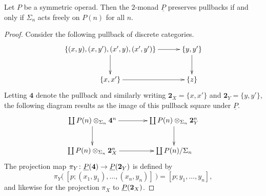 \begin{prop}\label{prop:P-2cart}
Let $P$ be a symmetric operad. Then the $2$-monad $\underline{P}$ preserves pullbacks if and only if $\Sigma_{n}$ acts freely on $P(n)$ for all $n$.
\end{prop}
\begin{proof}
Consider the following pullback of discrete categories.
    \[
        \xy
            (0,0)*+{\lbrace (x,y), (x,y'), (x',y), (x',y') \rbrace}="00";
            (40,0)*+{\lbrace y,y' \rbrace}="10";
            (0,-15)*+{\lbrace x, x' \rbrace}="01";
            (40,-15)*+{\lbrace z \rbrace}="11";
            {\ar "00" ; "10"};
            {\ar "10" ; "11"};
            {\ar "00" ; "01"};
            {\ar "01" ; "11"};
        \endxy
    \]
Letting $\mathbf{4}$ denote the pullback and similarly writing $\mathbf{2}_X = \{ x, x' \}$ and $\mathbf{2}_Y = \{y, y'\}$, the following diagram results as the image of this pullback square under $\underline{P}$.
    \[
        \xy
            (0,0)*+{\coprod \coeqsig{P}{\mathbf{4}}{n}}="00";
            (40,0)*+{\coprod \coeqsig{P}{\mathbf{2}_Y}{n}}="10";
            (0,-15)*+{\coprod \coeqsig{P}{\mathbf{2}_X}{n}}="01";
            (40,-15)*+{\coprod P(n)/\Sigma_n}="11";
            {\ar "00" ; "10"};
            {\ar "10" ; "11"};
            {\ar "00" ; "01"};
            {\ar "01" ; "11"}:
        \endxy
    \]
The projection map $\pi_Y \colon \underline{P}(\mathbf{4}) \rightarrow \underline{P}(\mathbf{2}_Y)$ is defined by
    \[
        \pi_Y\big(\ [p;(x_1,y_1), \ldots, (x_n,y_n)]\ \big) = [p;y_1,\ldots,y_n],
    \]
and likewise for the projection $\pi_X$ to $\underline{P}(\mathbf{2}_X)$.


\end{proof}
